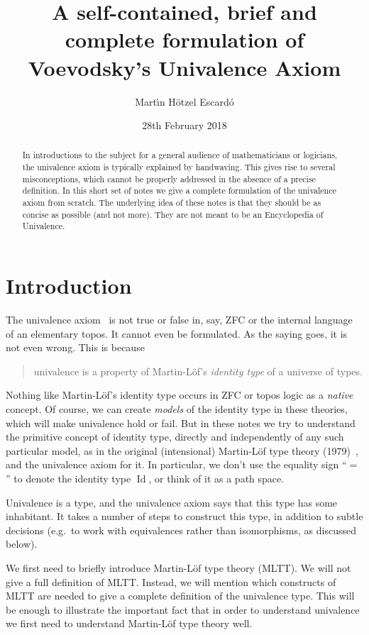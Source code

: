 \documentclass{article}
\title{A self-contained, brief and complete formulation of Voevodsky's Univalence Axiom}
\author{Mart{\'\i}n H\"otzel Escard\'o}
\date{28th February 2018}
\newcommand{\Id}{\operatorname{Id}}
\begin{document}
\maketitle

\begin{abstract}
  In introductions to the subject for a general audience of
  mathematicians or logicians, the univalence axiom is typically
  explained by handwaving. This gives rise to several misconceptions,
  which cannot be properly addressed in the absence of a precise
  definition. In this short set of notes we give a complete
  formulation of the univalence axiom from scratch. The underlying
  idea of these notes is that they should be as concise as possible
  (and not more). They are not meant to be an Encyclopedia of
  Univalence.
\end{abstract}

\section{Introduction}

The univalence axiom~\cite{unimath,hottbook,grayson} is not true or false
in, say, ZFC or the internal language of an elementary topos. It
cannot even be formulated. As the saying goes, it is not even wrong.
%
This is because
\begin{quote}
   univalence is a property of Martin-L\"of's \emph{identity type}
   of a universe of types.
\end{quote}
Nothing like Martin-L\"of's identity type occurs in ZFC or topos logic
as a \emph{native} concept. Of course, we can create \emph{models} of
the identity type in these theories, which will make univalence hold
or fail. But in these notes we try to understand the primitive concept
of identity type, directly and independently of any such particular
model, as in the original (intensional) Martin-L\"of type theory
(1979)~\cite{MR682410}, and the univalence axiom for it. In
particular, we don't use the equality sign ``$=$'' to denote the
identity type $\Id$, or think of it as a path space.


Univalence is a type, and the univalence axiom says that this type has
some inhabitant. It takes a number of steps to construct this type, in
addition to subtle decisions (e.g.\ to work with equivalences rather
than isomorphisms, as discussed below).

We first need to briefly introduce Martin-L\"of type theory (MLTT). We
will not give a full definition of MLTT. Instead, we will mention
which constructs of MLTT are needed to give a complete definition of
the univalence type. This will be enough to illustrate the important
fact that in order to understand univalence we first need to
understand Martin-L\"of type theory well.
\end{document}
